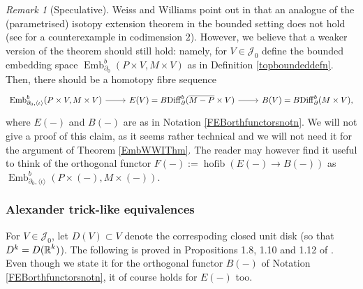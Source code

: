 \documentclass[a4paper, oneside]{amsart}
\newcommand{\diff}{\mathrm{Diff}}
\newcommand{\emb}{\operatorname{Emb}}
\newcommand{\hofib}{\operatorname{hofib}}
\newcommand{\1}{\mathds{1}}
\theoremstyle{remark}
\newtheorem{rem}[thm]{Remark}%
\theoremstyle{definition}
\newcommand{\R}{{\scaleobj{0.97}{\mathbb{R}}}}
\numberwithin{equation}{section}
\begin{document}
\begin{rem}[Speculative]
    Weiss and Williams point out in \cite[\S1]{WWI} that an analogue of the (parametrised) isotopy extension theorem in the bounded setting does not hold (see \cite[Ch. 8, Ex. 9]{Hirsch1976} for a counterexample in codimension $2$). However, we believe that a weaker version of the theorem should still hold: namely, for $V\in \mathcal J_0$ define the bounded embedding space $\emb^b_{\partial_0}(P\times V,M\times V)$ as in Definition \ref{topboundeddefn}. Then, there should be a homotopy fibre sequence
    $$
\begin{tikzcd}
    \emb^b_{\partial_0,\langle\iota\rangle}(P\times V, M\times V)\rar & E(V)=B\diff_\partial^b(\overline{M-P}\times V)\rar &B(V)=B\diff_\partial^b(M\times V),
\end{tikzcd}
    $$
where $E(-)$ and $B(-)$ are as in Notation \ref{FEBorthfunctorsnotn}. We will not give a proof of this claim, as it seems rather technical and we will not need it for the argument of Theorem \ref{EmbWWIThm}. The reader may however find it useful to think of the orthogonal functor $F(-):=\hofib(E(-)\to B(-))$ as $\emb^b_{\partial_0,\langle\iota\rangle}(P\times (-), M\times (-))$.
    
\end{rem}














\subsubsection{Alexander trick-like equivalences} For $V\in \mathcal J_0$, let $D(V)\subset V$ denote the correspoding closed unit disk (so that $D^k=D(\R^k)$). The following is proved in Propositions 1.8, 1.10 and 1.12 of \cite{WWI}. Even though we state it for the orthogonal functor $B(-)$ of Notation \ref{FEBorthfunctorsnotn}, it of course holds for $E(-)$ too.
\end{document}
